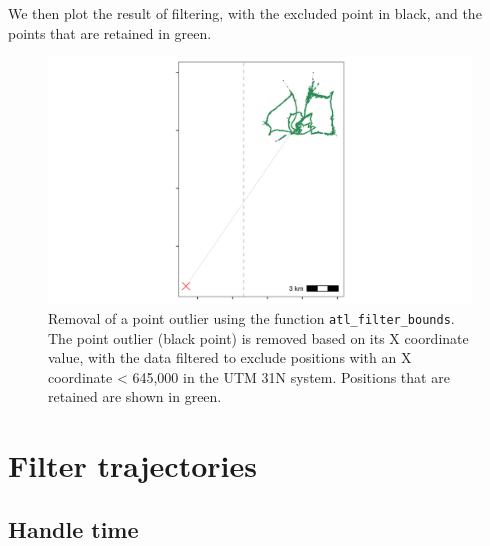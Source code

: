\documentclass[]{scrreprt}
\newenvironment{Shaded}{}{}
\newcommand{\CommentTok}[1]{\textcolor[rgb]{0.00,0.50,0.00}{#1}}
\newcommand{\DataTypeTok}[1]{#1}
\newcommand{\DecValTok}[1]{#1}
\newcommand{\KeywordTok}[1]{\textcolor[rgb]{0.00,0.00,1.00}{#1}}
\newcommand{\NormalTok}[1]{#1}
\newcommand{\OperatorTok}[1]{#1}
\newcommand{\OtherTok}[1]{\textcolor[rgb]{1.00,0.25,0.00}{#1}}
\newcommand{\StringTok}[1]{\textcolor[rgb]{0.00,0.50,0.50}{#1}}
\begin{document}
We then plot the result of filtering, with the excluded point in black, and the points that are retained in green.

\begin{Shaded}
\end{Shaded}

\begin{figure}
\centering
\includegraphics{figures/fig_calib_bbox.png}
\caption{Removal of a point outlier using the function \texttt{atl\_filter\_bounds}. The point outlier (black point) is removed based on its X coordinate value, with the data filtered to exclude positions with an X coordinate \textless{} 645,000 in the UTM 31N system. Positions that are retained are shown in green.}
\end{figure}

\hypertarget{filter-trajectories}{%
\section{Filter trajectories}\label{filter-trajectories}}

\hypertarget{handle-time}{%
\subsection{Handle time}\label{handle-time}}
\end{document}
